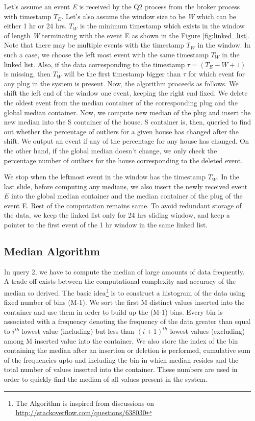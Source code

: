 Let's assume an event \textit{E} is received by the Q2 process from the broker process with timestamp \textit{$T_E$}.
Let's also assume the window size to be \textit{W} which can be either 1 hr or 24 hrs.
\textit{$T_W$} is the minimum timestamp which exists in the window of length \textit{W} terminating with the event E as shown in the Figure \ref{fig:linked_list}. Note that there may be multiple events with the timestamp $T_W$ in the window. In such a case, we choose the left most event with the same timestamp $T_W$ in the linked list. Also, if the data corresponding to the timestamp $\tau = (T_E - W +1)$ is missing, then $T_W$ will be the first timestamp bigger than $\tau$ for which event for any plug in the system is present. Now, the algorithm proceeds as follows.
We shift the left end of the window one event, keeping the right end fixed. We delete the oldest event from the median container of the corresponding plug and the global median container.
Now, we compute new median of the plug and insert the new median into the S container of the house.
S container is, then, queried to find out whether the percentage of outliers for a given house has changed after the shift. We output an event if any of the percentage for any house has changed.
On the other hand, if the global median doesn't change, we only check the percentage number of outliers for the house corresponding to the deleted event.

We stop when the leftmost event in the window has the timestamp $T_W$. In the last slide, before computing any medians, we also insert the newly received event $E$ into the global median container and the median container of the plug of the event E. Rest of the computation remains same. To avoid redundant storage of the data, we keep the linked list only for 24 hrs sliding window, and keep a pointer to the first event of the 1 hr window in the same linked list.

\subsection{Median Algorithm}
In query 2, we have to compute the median of large amounts of data frequently. A trade off exists between the computational complexity and accuracy of the median so derived. The basic idea\footnote{The Algorithm is inspired from discussions on \url{http://stackoverflow.com/questions/638030}} is to construct a histogram of the data using fixed number of bins (M-1). We sort the first M distinct values inserted into the container and use them in order to build up the (M-1) bins. Every bin is associated with a frequency denoting the frequency of the data greater than equal to $i^{th}$ lowest value (including) but less than $(i+1)^{th}$ lowest values (excluding) among M inserted value into the container. We also store the index of the bin containing the median after an insertion or deletion is performed, cumulative sum of the frequencies upto and including the bin in which median resides and the total number of values inserted into the container. These numbers are used in order to quickly find the median of all values present in the system.

